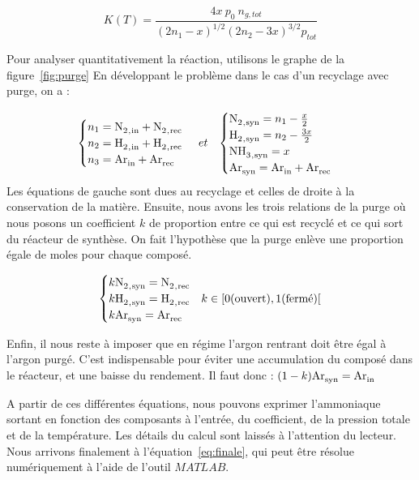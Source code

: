 $$K(T) = \frac{4x~p_0~n_{g,tot}}{(2n_1 - x)^{1/2} (2n_2 - 3x)^{3/2} p_{tot}}$$

Pour analyser quantitativement la réaction, utilisons le graphe de la figure~\ref{fig:purge}
En développant le problème dans le cas d'un recyclage avec purge, on a :

\begin{align}
\notag
\begin{cases}
 n_1 = \ce{N2_{,in} + N2_{,rec}} \\
 n_2 = \ce{H2_{,in} + H2_{,rec}} \\
 n_3 = \ce{Ar_{in} + Ar_{rec}} \\
\end{cases}
 &  ~et  &
\begin{cases}
 \ce{N2_{,syn}} = n_1 - \frac{x}{2} \\
 \ce{H2_{,syn}} = n_2 - \frac{3x}{2} \\
 \ce{NH3_{,syn}} = x \\
 \ce{Ar_{syn} = Ar_{in} + Ar_{rec}} \\ 
\end{cases}
\\
\end{align}
Les équations de gauche sont dues au recyclage et celles de droite à la conservation de la matière.
Ensuite, nous avons les trois relations de la purge où nous posons un coefficient $k$ de proportion entre ce qui est recyclé et ce qui sort du réacteur de synthèse. On fait l'hypothèse que la purge enlève une proportion égale de moles pour chaque composé.

$$
\begin{cases}
 k \ce{N2_{,syn}} = \ce{N2_{,rec}} \\ 
 k \ce{H2_{,syn}} = \ce{H2_{,rec}} & k \in [0 \text{(ouvert)}, 1 \text{(fermé)}[ \\
 k \ce{Ar_{syn}} = \ce{Ar_{rec}} \\
\end{cases}
$$

Enfin, il nous reste à imposer que en régime l'argon rentrant doit être égal à l'argon purgé. C'est indispensable pour éviter une accumulation du composé dans le réacteur, et une baisse du rendement. Il faut donc : $(1 - k)\ce{Ar_{syn}} = \ce{Ar_{in}}$

A partir de ces différentes équations, nous pouvons exprimer l'ammoniaque sortant en fonction des composants à l'entrée, du coefficient, de la pression totale et de la température. Les détails du calcul sont laissés à l'attention du lecteur. Nous arrivons finalement à l'équation~\eqref{eq:finale}, qui peut être résolue numériquement à l'aide de l'outil $MATLAB$.  

